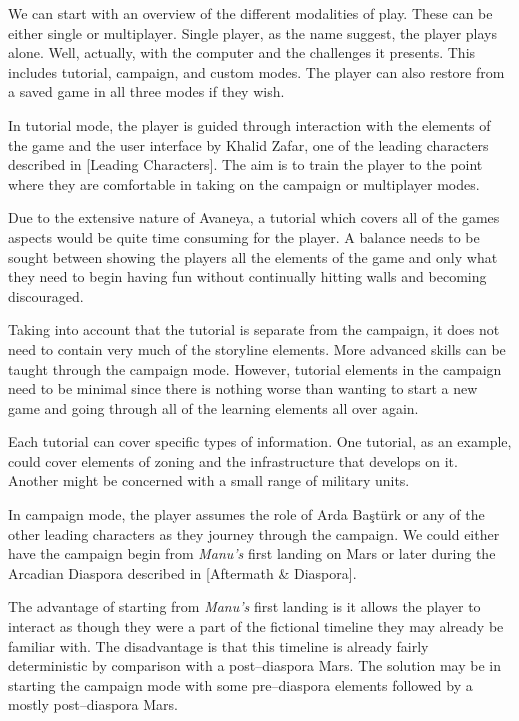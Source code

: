 
We can start with an overview of the different modalities of play. These can be either single or multiplayer. Single player, as the name suggest, the player plays alone. Well, actually, with the computer and the challenges it presents. This includes tutorial, campaign, and custom modes. The player can also restore from a saved game in all three modes if they wish.

In tutorial mode, the player is guided through interaction with the elements of the game and the user interface by Khalid Zafar, one of the leading characters described in [Leading Characters]. The aim is to train the player to the point where they are comfortable in taking on the campaign or multiplayer modes.

Due to the extensive nature of Avaneya, a tutorial which covers all of the games aspects would be quite time consuming for the player. A balance needs to be sought between showing the players all the elements of the game and only what they need to begin having fun without continually hitting walls and becoming discouraged.

Taking into account that the tutorial is separate from the campaign, it does not need to contain very much of the storyline elements. More advanced skills can be taught through the campaign mode. However, tutorial elements in the campaign need to be minimal since there is nothing worse than wanting to start a new game and going through all of the learning elements all over again.

Each tutorial can cover specific types of information. One tutorial, as an example, could cover elements of zoning and the infrastructure that develops on it. Another might be concerned with a small range of military units. %

In campaign mode, the player assumes the role of Arda Baştürk or any of the other leading characters as they journey through the campaign. We could either have the campaign begin from {\it Manu's} first landing on Mars or later during the Arcadian Diaspora described in [Aftermath & Diaspora]. 

The advantage of starting from {\it Manu's} first landing is it allows the player to interact as though they were a part of the fictional timeline they may already be familiar with. The disadvantage is that this timeline is already fairly deterministic by comparison with a post--diaspora Mars. The solution may be in starting the campaign mode with some pre--diaspora elements followed by a mostly post--diaspora Mars.

